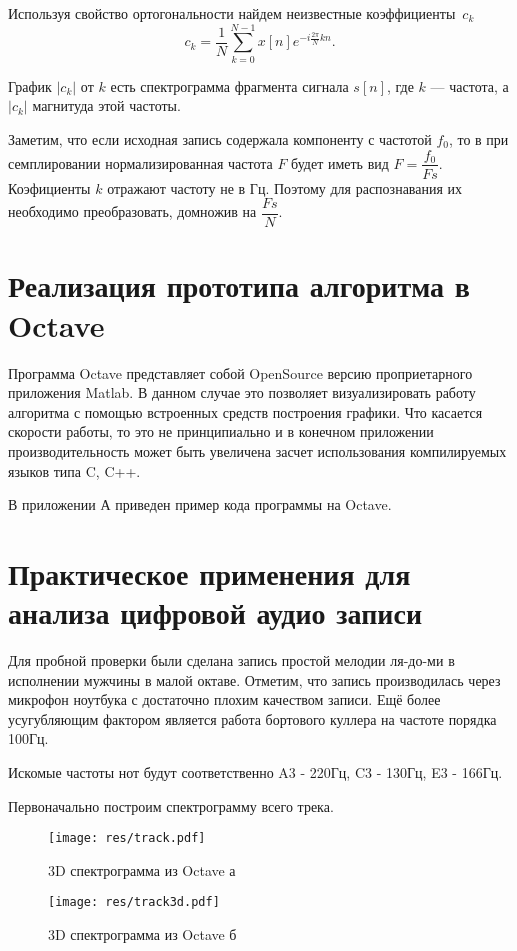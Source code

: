 \documentclass[oneside, final, 14pt]{extarticle}
\begin{document}
  Используя свойство ортогональности найдем неизвестные коэффициенты~$c_k$
  \[
    c_k = \dfrac{1}{N} \sum_{k=0}^{N-1} x[n] e^{-i\tfrac{2\pi}{N}kn}.
  \]

  График $|c_k|$ от $k$ есть спектрограмма фрагмента сигнала $s[n]$, где $k$ --- частота,
  а $|c_k|$ магнитуда этой частоты.

  Заметим, что если исходная запись содержала компоненту с частотой $f_0$, то
  в при семплировании нормализированная частота $F$ будет иметь вид $F=\dfrac{f_0}{Fs}$.
  Коэфициенты $k$ отражают частоту не в Гц. Поэтому для распознавания их необходимо преобразовать,
  домножив на $\dfrac{Fs}{N}$.

\cleardoublepage
\section{Реализация прототипа алгоритма в Octave}
  Программа Octave представляет собой OpenSource версию проприетарного приложения
  Matlab. В данном случае это позволяет визуализировать работу алгоритма с помощью
  встроенных средств построения графики. Что касается скорости работы, то это не
  принципиально и в конечном приложении производительность может быть увеличена
  засчет использования компилируемых языков типа C, C++.

  В приложении А приведен пример кода программы на Octave.

\cleardoublepage
\section{Практическое применения для анализа цифровой аудио записи}

  Для пробной проверки были сделана запись простой мелодии ля-до-ми в исполнении мужчины
  в малой октаве. Отметим, что запись производилась через микрофон ноутбука с
  достаточно плохим качеством записи. Ещё более усугубляющим фактором является
  работа бортового куллера на частоте порядка 100Гц.

  Искомые частоты нот будут соответственно A3 - 220Гц, C3 - 130Гц, E3 - 166Гц.

  Первоначально построим спектрограмму всего трека.
  \begin{figure}[h]
    \begin{multicols}{2}
      \hfill
      \texttt{[image: res/track.pdf]}
      \hfill
      \caption{3D спектрограмма из Octave а}
      \label{pic_3da}
      \hfill
      \texttt{[image: res/track3d.pdf]}
      \hfill
      \caption{3D спектрограмма из Octave б}
      \label{pic_3db}
    \end{multicols}
  \end{figure}
\end{document}
